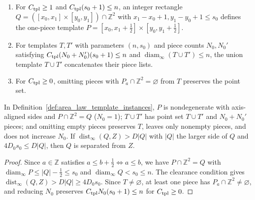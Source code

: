 \begin{definition}
    \label{def:area_law_template_instances}
    \leanok
    \begin{enumerate}
        \item For $C_{\rm tpl}\ge1$ and $C_{\rm tpl}(s_0+1)\le n$, an integer
              rectangle $Q=([x_0,x_1]\times[y_0,y_1])\cap\mathbb Z^2$ with
              $x_1-x_0+1,y_1-y_0+1\le s_0$ defines the one-piece template
              $P=[x_0,x_1+\tfrac12]\times[y_0,y_1+\tfrac12]$.
        \item For templates $T,T'$ with parameters $(n,s_0)$ and piece counts
              $N_0,N_0'$ satisfying $C_{\rm tpl}(N_0+N_0')(s_0+1)\le n$ and
              $\operatorname{diam}_\infty(T\cup T')\le n$, the union template
              $T\cup T'$ concatenates their piece lists.
        \item For $C_{\rm tpl}\ge0$, omitting pieces with
              $P_a\cap\mathbb Z^2=\varnothing$ from $T$ preserves the point set.
    \end{enumerate}
\end{definition}

\begin{lemma}
    \label{lem:area_law_template_instances}
    \leanok
    In Definition~\ref{def:area_law_template_instances}, $P$ is nondegenerate
    with axis-aligned sides and $P\cap\mathbb Z^2=Q$ ($N_0=1$); $T\cup T'$ has
    point set $T\cup T'$ and $N_0+N_0'$ pieces; and omitting empty pieces
    preserves $T$, leaves only nonempty pieces, and does not increase $N_0$. If
    $\operatorname{dist}_\infty(Q,Z)>D|Q|$ with $|Q|$ the larger side of $Q$
    and $4D_0s_0\le D|Q|$, then $Q$ is separated from $Z$.
\end{lemma}
\begin{proof}
    \leanok
    Since $a\in\mathbb Z$ satisfies $a\le b+\tfrac12\iff a\le b$, we have
    $P\cap\mathbb Z^2=Q$ with $\operatorname{diam}_\infty P\le|Q|-\tfrac12\le s_0$
    and $\operatorname{diam}_\infty Q<s_0\le n$. The clearance condition gives
    $\operatorname{dist}_\infty(Q,Z)>D|Q|\ge4D_0s_0$. Since $T\ne\varnothing$,
    at least one piece has $P_a\cap\mathbb Z^2\ne\varnothing$, and reducing
    $N_0$ preserves $C_{\rm tpl}N_0(s_0+1)\le n$ for $C_{\rm tpl}\ge0$.
\end{proof}

